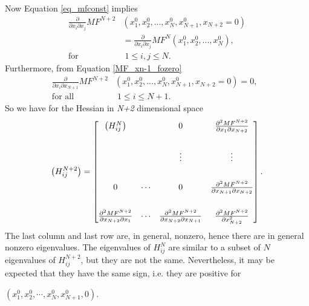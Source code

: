 Now Equation \ref{eq_mfconst} implies
\begin{equation}
\begin{split}
\frac{\partial}{\partial{x_i}\partial{x_j}}MF^{N+2}&(x^{0}_1, x^{0}_{2},...,x^{0}_{N},x^{0}_{N+1},x_{N+2}=0) \\
&= \frac{\partial}{\partial{x_i}\partial{x_j}}MF^{N}(x^{0}_1, x^{0}_{2},...,x^{0}_{N}), \\
\text{for} \;\;&\; 1\leq i,j \leq N.
\end{split}
\end{equation}Furthermore, from Equation \ref{MF_xn-1_fozero}
\begin{equation}
\begin{split}
\frac{\partial}{\partial{x_i}\partial{x_{N+1}}}MF^{N+2}&(x^{0}_1, x^{0}_{2},...,x^{0}_{N},x^{0}_{N+1},x_{N+2}=0) = 0, \;\; \\
\text{for all} & \;1\leq i \leq N+1.
\end{split}
\end{equation}
So we have for the Hessian in \textit{N+2} dimensional space
\begin{equation}\label{eq: the hessian}
\left( H^{N+2}_{ij} \right) = 
\begin{bmatrix}
\Large{\left( H^N_{ij} \right)}       &                 &   0                  & \frac{\partial{^2MF^{N+2}}}{\partial{x_1}\partial{x_{N+2}}} \\[2em]
                                                    &                 & \vdots         & \vdots \\[2em]
 0                                                 & \cdots    & 0                  & \frac{\partial{^2MF^{N+2}}}{\partial{x_{N+1}\partial{x_{N+2}}}}  \\[2em]
 \frac{\partial{^2MF^{N+2}}}{\partial{x_{N+2}}\partial{x_1}}   &\cdots  & \frac{\partial{^2MF^{N+2}}}{\partial{x_{N+2}}\partial{x_{N+1}}} & \frac{\partial{^2MF^{N+2}}}{\partial{x^2_{N+2}}}
\end{bmatrix}.
\end{equation}The last column and last row are, in general, nonzero, hence there are in general nonzero eigenvalues.
The eigenvalues of $H^{N}_{ij}$ are similar to a subset of $N$ eigenvalues of $H^{N+2}_{ij}$, but they are not the same. Nevertheless, it may be expected that they have the same sign, i.e. they are positive for

\vspace{0.1em}
\centerline {$(x^0_1, x^0_{2},\cdots,x^0_{N}, x^0_{N+1},0)$.}
\vspace{0.5em}

